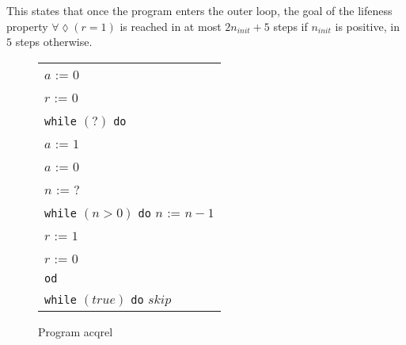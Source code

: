 \documentclass[11pt,a4paper,titlepage]{article}
\theoremstyle{definition}
\begin{document}
This states that once the program enters the outer loop, the goal of the lifeness property $\forall\lozenge(r = 1)$ is reached in at most 
$2n_{init} + 5$ steps if $n_{init}$ is positive, in $5$ steps otherwise.

\begin{figure}
    \begin{center}
        \begin{tabular}{l}
            $a$ := $0$ \\
            $r$ := $0$ \\
            \texttt{while} $(?)$ \texttt{do} \\
            \hspace{1em}$a$ := $1$ \\
            \hspace{1em}$a$ := $0$ \\
            \hspace{1em}$n$ := $?$ \\
            \hspace{1em}\texttt{while} $(n > 0)$ \texttt{do} $n$ := $n - 1$ \\
            \hspace{1em}$r$ := $1$ \\
            \hspace{1em}$r$ := $0$ \\
            \texttt{od}\\
            \texttt{while} $(true)$ \texttt{do} $skip$ \\
        \end{tabular}
    \end{center}
    \vspace{-1em}
    \caption{Program \textsf{acqrel}}
    \label{fig:acqrel}
\end{figure}
\end{document}
